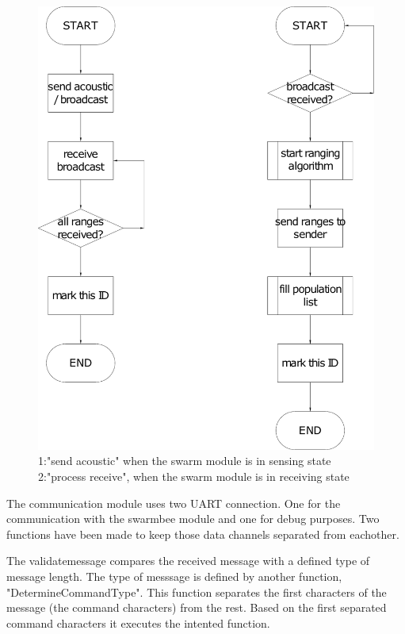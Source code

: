 \documentclass[10pt,a4paper]{article}
\begin{document}
\begin{figure}[H]
   \centering
   \includegraphics[width=\textwidth]{sendre.pdf}
   \caption{1:"send acoustic" when the swarm module is in sensing state 2:"process receive", when the swarm module is in receiving state}
   \label{fig:sendre}
\end{figure}




The communication module uses two UART connection. One for the communication with the swarmbee module and one for debug purposes. Two functions have been made to keep those data channels separated from eachother.

The validatemessage compares the received message with a defined type of message length. The type of messsage is defined by another function, "DetermineCommandType". This function separates the first characters of the message (the command characters) from the rest. Based on the first separated command characters it executes the intented function.


\end{document}
